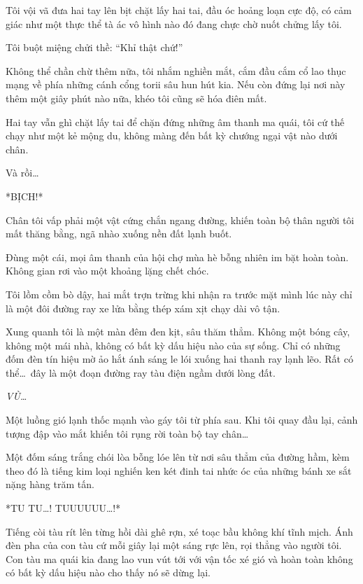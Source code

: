 \documentclass[../main.tex]{subfiles}
\begin{document}
Tôi vội vã đưa hai tay lên bịt chặt lấy hai tai, đầu óc hoảng loạn cực độ, có cảm giác như một thực thể tà ác vô hình nào đó đang chực chờ nuốt chửng lấy tôi.


Tôi buột miệng chửi thề: ``Khỉ thật chứ!''

Không thể chần chừ thêm nữa, tôi nhắm nghiền mắt, cắm đầu cắm cổ lao thục mạng về phía những cánh cổng torii sâu hun hút kia. Nếu còn đứng lại nơi này thêm một giây phút nào nữa, khéo tôi cũng sẽ hóa điên mất.

Hai tay vẫn ghì chặt lấy tai để chặn đứng những âm thanh ma quái, tôi cứ thế chạy như một kẻ mộng du, không màng đến bất kỳ chướng ngại vật nào dưới chân.

Và rồi\dots

*BỊCH!*

Chân tôi vấp phải một vật cứng chắn ngang đường, khiến toàn bộ thân người tôi mất thăng bằng, ngã nhào xuống nền đất lạnh buốt.

Đùng một cái, mọi âm thanh của hội chợ mùa hè bỗng nhiên im bặt hoàn toàn. Không gian rơi vào một khoảng lặng chết chóc.

Tôi lồm cồm bò dậy, hai mắt trợn trừng khi nhận ra trước mặt mình lúc này chỉ là một đôi đường ray xe lửa bằng thép xám xịt chạy dài vô tận.

Xung quanh tôi là một màn đêm đen kịt, sâu thăm thẳm. Không một bóng cây, không một mái nhà, không có bất kỳ dấu hiệu nào của sự sống. Chỉ có những đốm đèn tín hiệu mờ ảo hắt ánh sáng le lói xuống hai thanh ray lạnh lẽo. Rất có thể\dots\ đây là một đoạn đường ray tàu điện ngầm dưới lòng đất.


\textit{VÙ\dots}

Một luồng gió lạnh thốc mạnh vào gáy tôi từ phía sau. Khi tôi quay đầu lại, cảnh tượng đập vào mắt khiến tôi rụng rời toàn bộ tay chân\dots

Một đốm sáng trắng chói lòa bỗng lóe lên từ nơi sâu thẳm của đường hầm, kèm theo đó là tiếng kim loại nghiến ken két đinh tai nhức óc của những bánh xe sắt nặng hàng trăm tấn.

*TU TU\dots! TUUUUUU\dots!*


Tiếng còi tàu rít lên từng hồi dài ghê rợn, xé toạc bầu không khí tĩnh mịch. Ánh đèn pha của con tàu cứ mỗi giây lại một sáng rực lên, rọi thẳng vào người tôi. Con tàu ma quái kia đang lao vun vút tới với vận tốc xé gió và hoàn toàn không có bất kỳ dấu hiệu nào cho thấy nó sẽ dừng lại.
\end{document}
